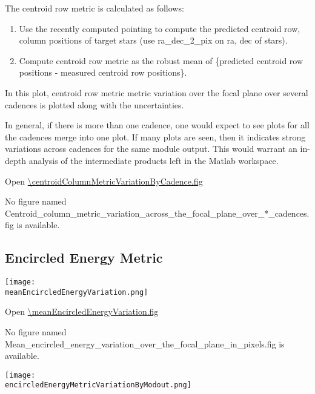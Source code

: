 The centroid row metric is calculated as follows: 

\begin{enumerate}
\item 
  Use the recently computed pointing to compute the predicted centroid
  row, column positions of target stars (use ra\_dec\_2\_pix on ra, dec
  of stars).
\item 
  Compute centroid row metric as the robust mean of \{predicted centroid
  row positions - measured centroid row positions\}.
\end{enumerate}

In this plot, centroid row metric metric variation over the focal
plane over several cadences is plotted along with the uncertainties.

In general, if there is more than one cadence, one would expect to see
plots for all the cadences merge into one plot. If many plots are
seen, then it indicates strong variations across cadences for the same
module output. This would warrant an in-depth analysis of the
intermediate products left in the Matlab workspace.

Open \url{\centroidColumnMetricVariationByCadence.fig}

\else
No figure named
Centroid\_column\_metric\_variation\_across\_the\_focal\_plane\_over\_*\_cadences.fig is
available.
\fi
\clearpage

\subsection{Encircled Energy Metric}

\ifdefined \meanEncircledEnergyVariation

\begin{center}
  \texttt{[image: \\meanEncircledEnergyVariation.png]}
\end{center}

\meanEncircledEnergyVariationCaption

Open \url{\meanEncircledEnergyVariation.fig}

\else
No figure named
Mean\_encircled\_energy\_variation\_over\_the\_focal\_plane\_in\_pixels.fig is
available.
\fi
\clearpage

\ifdefined \encircledEnergyMetricVariationByModout

\begin{center}
  \texttt{[image: \\encircledEnergyMetricVariationByModout.png]}
\end{center}

